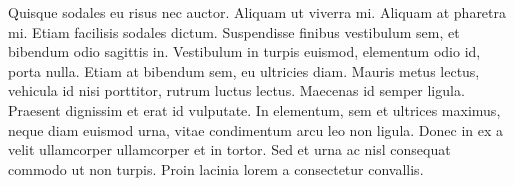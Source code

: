 Quisque sodales eu risus nec auctor. Aliquam ut viverra mi. Aliquam at pharetra mi. Etiam facilisis sodales dictum. Suspendisse finibus vestibulum sem, et bibendum odio sagittis in. Vestibulum in turpis euismod, elementum odio id, porta nulla. Etiam at bibendum sem, eu ultricies diam. Mauris metus lectus, vehicula id nisi porttitor, rutrum luctus lectus. Maecenas id semper ligula. Praesent dignissim et erat id vulputate. In elementum, sem et ultrices maximus, neque diam euismod urna, vitae condimentum arcu leo non ligula. Donec in ex a velit ullamcorper ullamcorper et in tortor. Sed et urna ac nisl consequat commodo ut non turpis. Proin lacinia lorem a consectetur convallis.